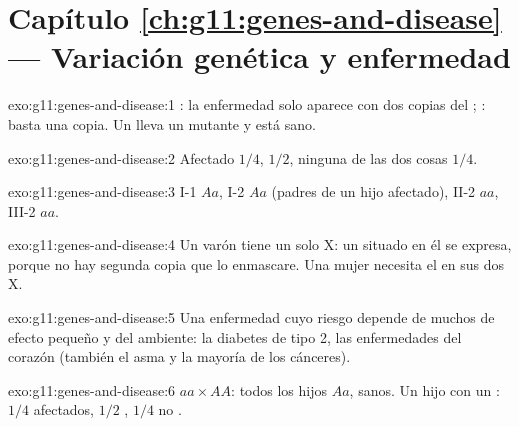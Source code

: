 \section*{Capítulo \ref{ch:g11:genes-and-disease} --- Variación genética y enfermedad}

\begin{solution}{exo:g11:genes-and-disease:1}
: la enfermedad solo aparece con dos copias del ;
: basta una copia. Un  lleva un  mutante 
y está sano.
\end{solution}

\begin{solution}{exo:g11:genes-and-disease:2}
Afectado $1/4$,  $1/2$, ninguna de las dos cosas $1/4$.
\end{solution}

\begin{solution}{exo:g11:genes-and-disease:3}
I-1 $Aa$, I-2 $Aa$ (padres de un hijo afectado), II-2 $aa$, III-2 $aa$.
\end{solution}

\begin{solution}{exo:g11:genes-and-disease:4}
Un varón tiene un solo  X: un   situado en él se
expresa, porque no hay segunda copia que lo enmascare. Una mujer
necesita el  en sus dos  X.
\end{solution}

\begin{solution}{exo:g11:genes-and-disease:5}
Una enfermedad cuyo riesgo depende de muchos  de efecto pequeño y
del ambiente: la diabetes de tipo 2, las enfermedades del corazón
(también el asma y la mayoría de los cánceres).
\end{solution}

\begin{solution}{exo:g11:genes-and-disease:6}
$aa \times AA$: todos los hijos $Aa$,  sanos. Un hijo
 con un : $1/4$ afectados, $1/2$ , $1/4$ no
.
\end{solution}

